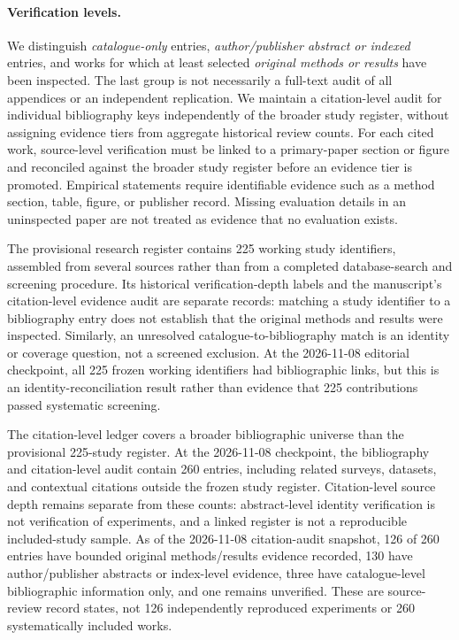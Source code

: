 \paragraph{Verification levels.}
We distinguish \emph{catalogue-only} entries, \emph{author/publisher abstract or indexed} entries, and works for which at least selected \emph{original methods or results} have been inspected.
The last group is not necessarily a full-text audit of all appendices or an independent replication.
We maintain a citation-level audit for individual bibliography keys independently of the broader study register, without assigning evidence tiers from aggregate historical review counts.
For each cited work, source-level verification must be linked to a primary-paper section or figure and reconciled against the broader study register before an evidence tier is promoted.
Empirical statements require identifiable evidence such as a method section, table, figure, or publisher record.
Missing evaluation details in an uninspected paper are not treated as evidence that no evaluation exists.

The provisional research register contains 225 working study identifiers, assembled from several sources rather than from a completed database-search and screening procedure.
Its historical verification-depth labels and the manuscript's citation-level evidence audit are separate records: matching a study identifier to a bibliography entry does not establish that the original methods and results were inspected.
Similarly, an unresolved catalogue-to-bibliography match is an identity or coverage question, not a screened exclusion.
At the 2026-11-08 editorial checkpoint, all 225 frozen working identifiers had bibliographic links, but this is an identity-reconciliation result rather than evidence that 225 contributions passed systematic screening.

The citation-level ledger covers a broader bibliographic universe than the provisional 225-study register.
At the 2026-11-08 checkpoint, the bibliography and citation-level audit contain 260 entries, including related surveys, datasets, and contextual citations outside the frozen study register.
Citation-level source depth remains separate from these counts: abstract-level identity verification is not verification of experiments, and a linked register is not a reproducible included-study sample.
As of the 2026-11-08 citation-audit snapshot, 126 of 260 entries have bounded original methods/results evidence recorded, 130 have author/publisher abstracts or index-level evidence, three have catalogue-level bibliographic information only, and one remains unverified.
These are source-review record states, not 126 independently reproduced experiments or 260 systematically included works.

